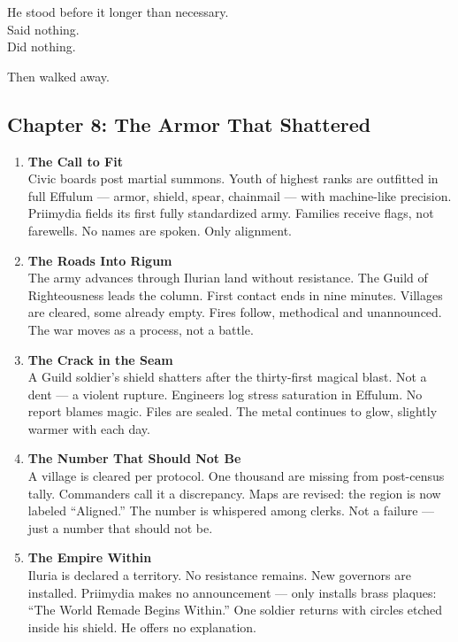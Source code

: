 \documentclass[9pt]{article}
\begin{document}
He stood before it longer than necessary.\\
Said nothing.\\
Did nothing.

Then walked away.

\newpage

\subsection*{Chapter 8: The Armor That Shattered}

\vspace{1in}

\begin{center}
\begin{enumerate}
    \item \textbf{The Call to Fit} \\
    Civic boards post martial summons. Youth of highest ranks are outfitted in full Effulum — armor, shield, spear, chainmail — with machine-like precision. Priimydia fields its first fully standardized army. Families receive flags, not farewells. No names are spoken. Only alignment.

    \vspace{.3in}
    \item \textbf{The Roads Into Rigum} \\
    The army advances through Ilurian land without resistance. The Guild of Righteousness leads the column. First contact ends in nine minutes. Villages are cleared, some already empty. Fires follow, methodical and unannounced. The war moves as a process, not a battle.

    \vspace{.3in}
    \item \textbf{The Crack in the Seam} \\
    A Guild soldier’s shield shatters after the thirty-first magical blast. Not a dent — a violent rupture. Engineers log stress saturation in Effulum. No report blames magic. Files are sealed. The metal continues to glow, slightly warmer with each day.

    \vspace{.3in}
    \item \textbf{The Number That Should Not Be} \\
    A village is cleared per protocol. One thousand are missing from post-census tally. Commanders call it a discrepancy. Maps are revised: the region is now labeled “Aligned.” The number is whispered among clerks. Not a failure — just a number that should not be.

    \vspace{.3in}
    \item \textbf{The Empire Within} \\
    Iluria is declared a territory. No resistance remains. New governors are installed. Priimydia makes no announcement — only installs brass plaques: “The World Remade Begins Within.” One soldier returns with circles etched inside his shield. He offers no explanation.
\end{enumerate}
\end{center}
\end{document}
